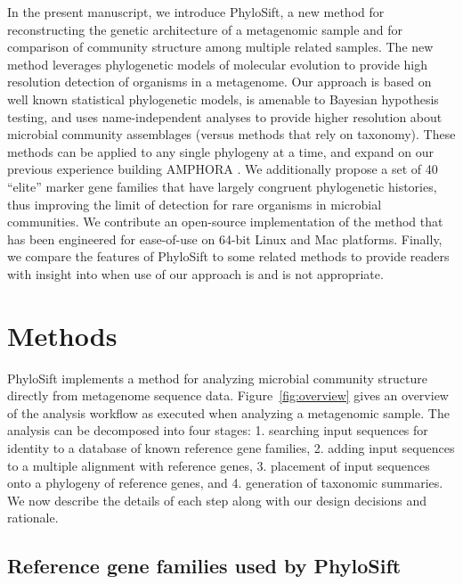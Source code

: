 \documentclass[10pt]{article}
\begin{document}
In the present manuscript, we introduce PhyloSift, a new method for reconstructing the genetic architecture of a metagenomic sample and for comparison of community structure among multiple related samples.
The new method leverages phylogenetic models of molecular evolution to provide high resolution detection of organisms in a metagenome.
Our approach is based on well known statistical phylogenetic models, is amenable to Bayesian hypothesis testing, and uses name-independent analyses to provide higher resolution about microbial community assemblages (versus methods that rely on taxonomy).
These methods can be applied to any single phylogeny at a time, and expand on our previous experience building AMPHORA \cite{WuEisen2008}.
We additionally propose a set of 40 ``elite'' marker gene families that have largely congruent phylogenetic histories, thus improving the limit of detection for rare organisms in microbial communities.
We contribute an open-source implementation of the method that has been engineered for ease-of-use on 64-bit Linux and Mac platforms.
Finally, we compare the features of PhyloSift to some related methods to provide readers with insight into when use of our approach is and is not appropriate.


\section*{Methods}

PhyloSift implements a method for analyzing microbial community structure directly from metagenome sequence data.
Figure~\ref{fig:overview} gives an overview of the analysis workflow as executed when analyzing a metagenomic sample.
The analysis can be decomposed into four stages: 1. searching input sequences for identity to a database of known reference gene families, 2. adding input sequences to a multiple alignment with reference genes, 3. placement of input sequences onto a phylogeny of reference genes, and 4. generation of taxonomic summaries. We now describe the details of each step along with our design decisions and rationale.


\subsection*{Reference gene families used by PhyloSift}
\end{document}
